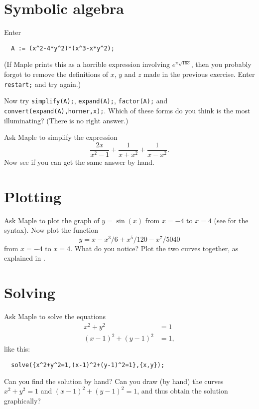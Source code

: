 \documentclass[a4paper,10pt]{amsbook}
\numberwithin{example}{chapter}
\begin{document}
\section{Symbolic algebra}

\begin{exercise}\label{ex-horner}
 Enter
\begin{verbatim}
  A := (x^2-4*y^2)*(x^3-x*y^2);
\end{verbatim}
 (If Maple prints this as a horrible expression involving
 $e^{\pi\sqrt{163}}$, then you probably forgot to remove the
 definitions of $x$, $y$ and $z$ made in the previous exercise.  Enter
 \verb~restart;~ and try again.) 
 
 Now try \verb~simplify(A);~, \verb~expand(A);~, \verb~factor(A);~ and
 \verb~convert(expand(A),horner,x);~.  Which of these forms do you think is
 the most illuminating?  (There is no right answer.) 
\end{exercise}

\begin{exercise}\label{ex-rat-misc}
 Ask Maple to simplify the expression 
 \[ \frac{2x}{x^2-1} + \frac{1}{x+x^2} + \frac{1}{x-x^2}. \]
 Now see if you can get the same answer by hand. 
\end{exercise}

\section{Plotting}

\begin{exercise}\label{ex-sin-taylor}
 Ask Maple to plot the graph of $y=\sin(x)$ from $x=-4$ to
 $x=4$ (see \note{\NOTEbasicplot} for the syntax).  Now plot
 the function
 \[ y = x-x^3/6+x^5/120-x^7/5040 \]
 from $x=-4$ to $x=4$.  What do you notice?  Plot the two curves
 together, as explained in \note{\NOTEtwoplots}.
\end{exercise}

\section{Solving}

\begin{exercise}
 Ask Maple to solve the equations 
 \begin{align*}
  x^2 + y^2 &= 1 \\
  (x-1)^2 + (y-1)^2 &= 1,
 \end{align*}
 like this:
\begin{verbatim}
  solve({x^2+y^2=1,(x-1)^2+(y-1)^2=1},{x,y});
\end{verbatim}
 Can you find the solution by hand?  Can you draw (by hand)
 the curves $x^2+y^2=1$ and $(x-1)^2+(y-1)^2=1$, and thus
 obtain the solution graphically?
\end{exercise}
\end{document}
